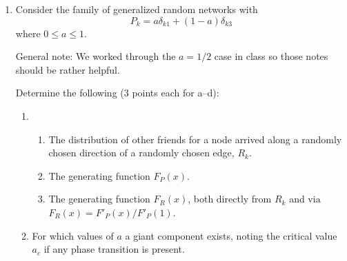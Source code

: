 \begin{enumerate}
       
   \solutionstart


   \solutionend


     \item
       Consider the family of generalized random networks with
       $$
       P_{k} 
       = 
       a 
       \delta_{k1} 
       + 
       (1-a) 
       \delta_{k3}
       $$
       where $0 \le a \le 1$.

       General note: We worked through the $a=1/2$ case in class
       so those notes should be rather helpful.

       Determine the following (3 points each for a--d):
       \begin{enumerate}
       \item 
         \begin{enumerate}
         \item 
           The distribution of other friends for a node
           arrived along a randomly chosen direction
           of a randomly chosen edge,
           $R_{k}$.

           
   \solutionstart


   \solutionend

         \item 
           The generating function $F_{P}(x)$.

           
   \solutionstart


   \solutionend

         \item 
           The generating function $F_{R}(x)$, both
           directly from $R_{k}$ and via 
           $F_{R}(x) = F'_{P}(x)/F'_{P}(1)$.

           
   \solutionstart


   \solutionend

         \end{enumerate}


       \item 
         For which values of $a$ a giant component exists,
         noting the critical value $a_{c}$ if any phase
         transition is present.

         
   \solutionstart



\end{enumerate}
\end{enumerate}

